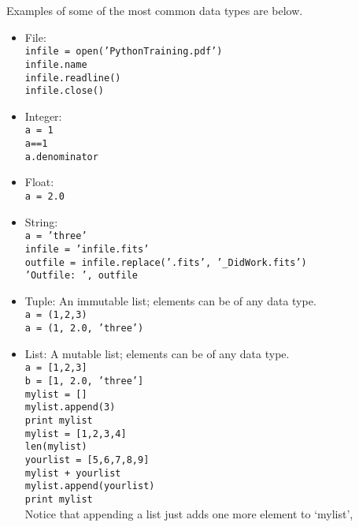 Examples of some of the most common data types are below.
\begin{itemize}
\item File: \\
  \texttt{\pytab infile = open('PythonTraining.pdf')} \\
  \texttt{\pytab infile.name} \\
  \texttt{\pytab infile.readline()}  \\
  \texttt{\pytab infile.close()}  
\item Integer: \\
 \texttt{\pytab a = 1} \\
 \texttt{\pytab a==1}  \\
 \texttt{\pytab a.denominator}
\item Float: \\
  \texttt{\pytab a = 2.0}
\item String:  \\
  \texttt{\pytab a = 'three'} \\
  \texttt{\pytab infile = 'infile.fits'} \\
  \texttt{\pytab outfile = infile.replace('.fits', '\_DidWork.fits')} \\
  \texttt{\pytab 'Outfile: ', outfile} 
\item Tuple: An immutable list; elements can be of any data type. \\
  \texttt{\pytab a = (1,2,3)}  \\
  \texttt{\pytab a = (1, 2.0, 'three')}
\item List: A mutable list; elements can be of any data type. \\
  \texttt{\pytab a = [1,2,3]}  \\
  \texttt{\pytab b = [1, 2.0, 'three']}  \\
  \texttt{\pytab mylist = [] }  \\
  \texttt{\pytab mylist.append(3) } \\
  \texttt{\pytab print mylist } \\
  \texttt{\pytab mylist = [1,2,3,4] } \\
  \texttt{\pytab len(mylist)} \\
  \texttt{\pytab yourlist = [5,6,7,8,9] } \\
  \texttt{\pytab mylist + yourlist }  \\
  \texttt{\pytab mylist.append(yourlist) }  \\
  \texttt{\pytab print mylist}  \\
  Notice that appending a list just adds one more element to `mylist',

\end{itemize}
